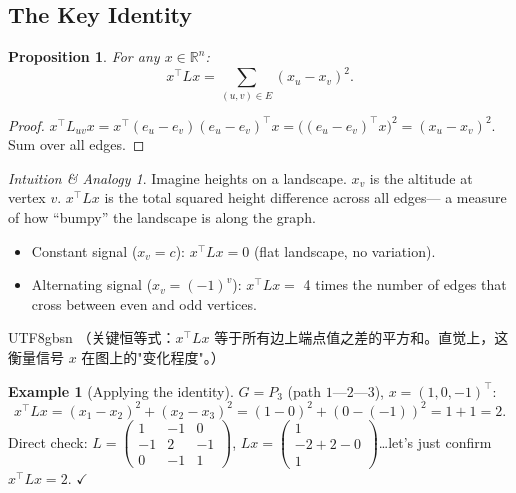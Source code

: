 \documentclass[12pt]{article}
\newtheorem{proposition}[theorem]{Proposition}
\theoremstyle{definition}
\newtheorem{example}[theorem]{Example}
\theoremstyle{remark}
\newtheorem{intuition}[theorem]{Intuition \& Analogy}
\begin{document}
\subsection{The Key Identity}
\label{sec:key-identity}

\begin{proposition}
For any $x \in \mathbb{R}^n$:
\[
  \boxed{x^\top L x = \sum_{(u,v)\in E}(x_u - x_v)^2.}
\]
\end{proposition}

\begin{proof}
$x^\top L_{uv} x = x^\top(e_u-e_v)(e_u-e_v)^\top x = \bigl((e_u-e_v)^\top x\bigr)^2 = (x_u-x_v)^2$.
Sum over all edges.
\end{proof}

\begin{intuition}
Imagine heights on a landscape.  $x_v$ is the altitude at vertex $v$.
$x^\top L x$ is the total squared height difference across all edges---
a measure of how ``bumpy'' the landscape is along the graph.
\begin{itemize}
  \item Constant signal ($x_v = c$): $x^\top L x = 0$ (flat landscape, no variation).
  \item Alternating signal ($x_v = (-1)^v$): $x^\top L x = $ 4 times the number of edges
        that cross between even and odd vertices.
\end{itemize}
\end{intuition}

\begin{CJK}{UTF8}{gbsn}
（关键恒等式：$x^\top L x$ 等于所有边上端点值之差的平方和。直觉上，这衡量信号 $x$ 在图上的"变化程度"。）
\end{CJK}

\begin{example}[Applying the identity]
$G = P_3$ (path $1$---$2$---$3$), $x = (1,0,-1)^\top$:
\[
  x^\top L x = (x_1-x_2)^2 + (x_2-x_3)^2 = (1-0)^2 + (0-(-1))^2 = 1+1 = 2.
\]
Direct check: $L = \begin{pmatrix}1&-1&0\\-1&2&-1\\0&-1&1\end{pmatrix}$,\;
$Lx = \begin{pmatrix}1\\-2+2-0\\1\end{pmatrix}$\ldots let's just confirm $x^\top L x = 2$. $\checkmark$
\end{example}
\end{document}

